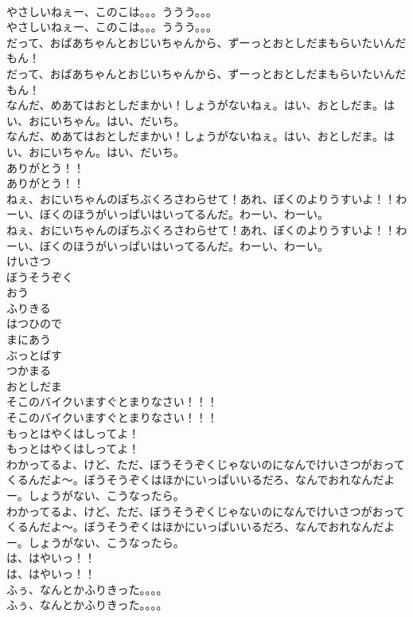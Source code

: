 \documentclass[8pt]{extreport}
\begin{document}
\begin{CJK}{UTF8}{min}
\\	やさしいねぇー、このこは。。。ううう。。。	
\\	やさしいねぇー、このこは。。。ううう。。。 
\\	だって、おばあちゃんとおじいちゃんから、ずーっとおとしだまもらいたいんだもん！	
\\	だって、おばあちゃんとおじいちゃんから、ずーっとおとしだまもらいたいんだもん！ 
\\	なんだ、めあてはおとしだまかい！しょうがないねぇ。はい、おとしだま。はい、おにいちゃん。はい、だいち。	
\\	なんだ、めあてはおとしだまかい！しょうがないねぇ。はい、おとしだま。はい、おにいちゃん。はい、だいち。 
\\	ありがとう！！	
\\	ありがとう！！ 
\\	ねぇ、おにいちゃんのぽちぶくろさわらせて！あれ、ぼくのよりうすいよ！！わーい、ぼくのほうがいっぱいはいってるんだ。わーい、わーい。	
\\	ねぇ、おにいちゃんのぽちぶくろさわらせて！あれ、ぼくのよりうすいよ！！わーい、ぼくのほうがいっぱいはいってるんだ。わーい、わーい。 
\\	けいさつ
\\	ぼうそうぞく
\\	おう
\\	ふりきる
\\	はつひので
\\	まにあう
\\	ぶっとばす
\\	つかまる
\\	おとしだま
\\	そこのバイクいますぐとまりなさい！！！	
\\	そこのバイクいますぐとまりなさい！！！ 
\\	もっとはやくはしってよ！	
\\	もっとはやくはしってよ！ 
\\	わかってるよ、けど、ただ、ぼうそうぞくじゃないのになんでけいさつがおってくるんだよ〜。ぼうそうぞくはほかにいっぱいいるだろ、なんでおれなんだよー。しょうがない、こうなったら。	
\\	わかってるよ、けど、ただ、ぼうそうぞくじゃないのになんでけいさつがおってくるんだよ〜。ぼうそうぞくはほかにいっぱいいるだろ、なんでおれなんだよー。しょうがない、こうなったら。 
\\	は、はやいっ！！	
\\	は、はやいっ！！ 
\\	ふぅ、なんとかふりきった。。。。	
\\	ふぅ、なんとかふりきった。。。。 

\end{CJK}
\end{document}
